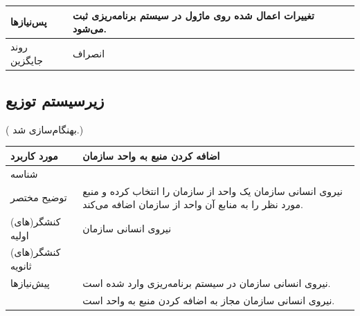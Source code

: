 \begin{table}[H]
\begin{tabular}{|p{3cm}|p{10cm}|}
		\hline
		
		پس‌نیازها &
		تغییرات اعمال شده روی ماژول در سیستم برنامه‌ریزی ثبت می‌شود. \\
		
		\hline
		
		روند جایگزین
		& انصراف \\
		\hline
		
	\end{tabular}
\end{table}

\newpage
\subsection{زیرسیستم توزیع}
({\color{red} بهنگام‌سازی شد.})
\begin{table}[H]
	\centering
	\begin{tabular}{|p{3cm}|p{10cm}|}
		\hline
		
		مورد کاربرد	& اضافه کردن منبع به واحد سازمان  \\
		\hline
		
		شناسه & 
		\stepcounter{usecase_ID}
		
		\arabic{usecase_ID} \\
		
		\hline
		
		توضیح مختصر & نیروی انسانی سازمان یک واحد از سازمان را انتخاب کرده و منبع مورد نظر را به منابع آن واحد از سازمان اضافه می‌کند. \\
		\hline
		
		کنشگر(های) اولیه& نیروی انسانی سازمان \\
		\hline
		
		کنشگر(های) ثانویه&  \\
		\hline
		
		پیش‌نیازها &
		نیروی انسانی سازمان در سیستم برنامه‌ریزی وارد شده است.\\
		& نیروی انسانی سازمان مجاز به اضافه کردن منبع به واحد است. \\
		\hline
		

\end{tabular}
\end{table}
